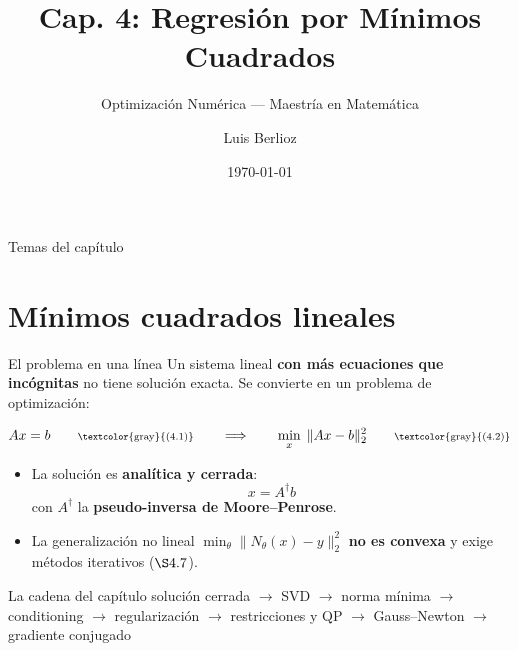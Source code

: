 \documentclass[10pt,aspectratio=169]{beamer}
\title{Cap. 4: Regresión por Mínimos Cuadrados}
\subtitle{Optimización Numérica --- Maestría en Matemática}
\author{Luis Berlioz}
\date{\today}
\begin{document}

\begin{frame}
  \titlepage
\end{frame}

\begin{frame}{Temas del capítulo}
  \tableofcontents
\end{frame}

\section{Mínimos cuadrados lineales}

\begin{frame}{El problema en una línea}
  \small
  Un sistema lineal \textbf{con más ecuaciones que incógnitas} no tiene solución
  exacta. Se convierte en un problema de optimización:

  \[
    Ax = b \qquad\text{\scriptsize\textcolor{gray}{(4.1)}}
    \qquad\Longrightarrow\qquad
    \min_x \; \|Ax - b\|_2^2 \qquad\text{\scriptsize\textcolor{gray}{(4.2)}}
  \]

  \begin{itemize}
    \item La solución es \textbf{analítica y cerrada}:
      \[
        x = A^{\dagger} b \tag{4.3}
      \]
      con $A^{\dagger}$ la \textbf{pseudo-inversa de Moore--Penrose}.
    \item La generalización no lineal
      $\displaystyle \min_\theta \|N_\theta(x) - y\|_2^2$
      \textbf{no es convexa} y exige métodos iterativos ($\S4{.}7$).
  \end{itemize}

  \begin{block}{La cadena del capítulo}
    \centering\scriptsize
    solución cerrada $\to$ SVD $\to$ norma mínima $\to$ conditioning
    $\to$ regularización $\to$ restricciones y QP $\to$ Gauss--Newton
    $\to$ gradiente conjugado
  \end{block}
\end{frame}
\end{document}
